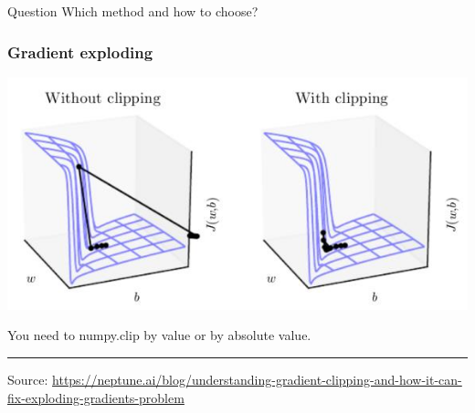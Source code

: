 \documentclass[fullscreen=true, bookmarks=true, hyperref={pdfencoding=unicode}]{beamer}
\begin{document}
\begin{frame}
    \begin{block}{Question}
    Which method and how to choose?
    \end{block}
\end{frame}


\begin{frame}
  \frametitle{Gradient exploding}
  \begin{center}
    \includegraphics[keepaspectratio,
                     width=0.6\paperwidth]{gradient_exploding.jpg}
  \end{center}
  
  You need to numpy.clip by value or by absolute value.

  \noindent\rule{8cm}{0.4pt}

  {\small Source: \href{https://neptune.ai/blog/understanding-gradient-clipping-and-how-it-can-fix-exploding-gradients-problem}{https://neptune.ai/blog/understanding-gradient-clipping-and-how-it-can-fix-exploding-gradients-problem}}

\end{frame}
\end{document}
